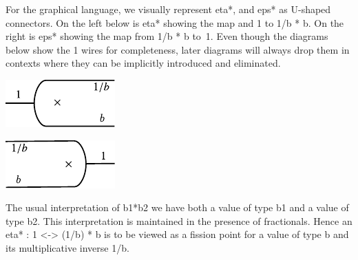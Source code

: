 \documentclass[preprint]{sigplanconf}
\begin{document}
For the graphical language, we visually represent {{eta*}}, and
{{eps*}} as U-shaped connectors. On the left below is {{eta*}} showing
the map and {{1}} to {{1/b * b}}.  On the right is {{eps*}} showing
the map from {{1/b * b}} to~1. Even though the diagrams below show the
{{1}} wires for completeness, later diagrams will always drop them in
contexts where they can be implicitly introduced and eliminated.
\begin{multicols}{2}
\begin{center}
  \includegraphics{diagrams/eta_times.pdf}
\end{center}
  
\begin{center}
  \includegraphics{diagrams/eps_times.pdf}
\end{center}
\end{multicols}

The usual interpretation of {{b1*b2}} we have both a value of type
{{b1}} and a value of type {{b2}}. This interpretation is maintained
in the presence of fractionals. Hence an {{eta* : 1 <-> (1/b) * b}} is
to be viewed as a fission point for a value of type {{b}} and its
multiplicative inverse {{1/b}}. 

\begin{multicols}{2}
\begin{center}
\end{center}

\begin{center}
\end{center}  
\end{multicols}
\end{document}
